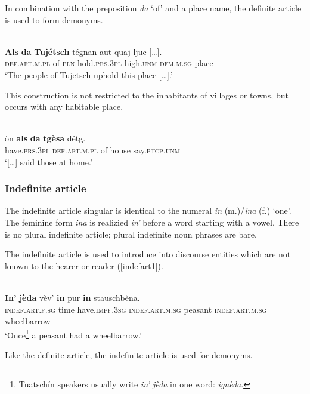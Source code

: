 In combination with the preposition \textit{da} ‘of’ and a place name, the definite article is used to form demonyms.

\ea

\\
\gll    \textbf{Als} \textbf{da} \textbf{Tujétsch} tégnan aut quaj ljuc […].\\
    \textsc{def.art.m.pl} of \textsc{pln} hold.\textsc{prs.3pl} high.\textsc{unm} \textsc{dem.m.sg} place\\
\glt `The people of Tujetsch uphold this place […].'
\z

This construction is not restricted to the inhabitants of villages or towns, but occurs with any habitable place.

\ea
{}\\
\gll […] òn \textbf{als} \textbf{da} \textbf{tgèsa} détg.\\
{} have.\textsc{prs.3pl} \textsc{def.art.m.pl} of house say.\textsc{ptcp.unm}\\
\glt `[…] said those at home.'
\z


\subsubsection{Indefinite article}
The indefinite article singular is identical to the numeral \textit{in} (m.)/\textit{ina} (f.) ‘one’. The feminine form \textit{ina} is realizied \textit{in'} before a word starting with a vowel. There is no plural indefinite article; plural indefinite noun phrases are bare.

The indefinite article is used to introduce into discourse entities which are not known to the hearer or reader  (\ref{indefart1}). 

\ea\label{indefart1}
\\
\gll \textbf{In'} \textbf{jèda} vèv’ \textbf{in} pur \textbf{in} stauschbèna.\\
     \textsc{indef.art.f.sg} time have.\textsc{impf.3sg} \textsc{indef.art.m.sg} peasant \textsc{indef.art.m.sg} wheelbarrow \\
\glt `Once\footnote{Tuatschín speakers usually write \textit{in' jèda} in one word: \textit{ignèda}.} a peasant had a wheelbarrow.'
\z

Like the definite article, the indefinite article is used for demonyms.

